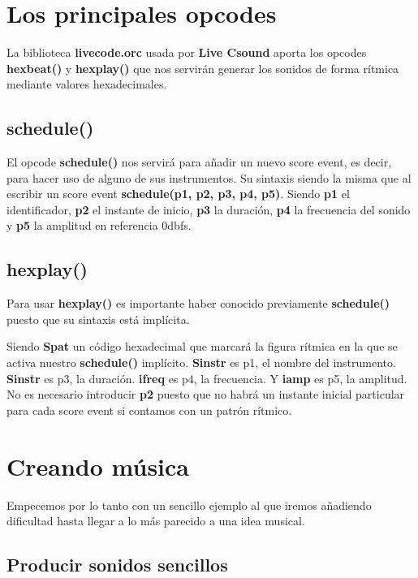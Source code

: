 \section{Los principales opcodes}

La biblioteca \textbf{livecode.orc} usada por \textbf{Live Csound} aporta los opcodes \textbf{hexbeat()} y \textbf{hexplay()} que nos servirán generar los sonidos de forma rítmica mediante valores hexadecimales.

\subsection{schedule()}

El opcode \textbf{schedule()} nos servirá para añadir un nuevo score event, es decir, para hacer uso de alguno de sus instrumentos. Su sintaxis siendo la misma que al escribir un score event \textbf{schedule(p1, p2, p3, p4, p5)}. Siendo \textbf{p1} el identificador, \textbf{p2} el instante de inicio, \textbf{p3} la duración, \textbf{p4} la frecuencia del sonido y \textbf{p5} la amplitud en referencia 0dbfs.

\subsection{hexplay()}

Para usar \textbf{hexplay()} es importante haber conocido previamente \textbf{schedule()} puesto que su sintaxis está implícita.  

 
Siendo \textbf{Spat} un código hexadecimal que marcará la figura rítmica en la que se activa nuestro \textbf{schedule()} implícito. \textbf{Sinstr} es p1, el nombre del instrumento. \textbf{Sinstr} es p3, la duración. \textbf{ifreq} es p4, la frecuencia. Y \textbf{iamp} es p5, la amplitud. No es necesario introducir \textbf{p2} puesto que no habrá un instante inicial particular para cada score event si contamos con un patrón rítmico.

\section{Creando música}

Empecemos por lo tanto con un sencillo ejemplo al que iremos añadiendo dificultad hasta llegar a lo más parecido a una idea musical.

\subsection{Producir sonidos sencillos}

